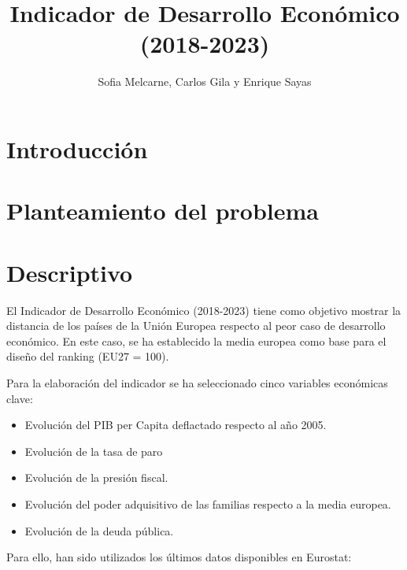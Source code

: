 \documentclass[
  letterpaper,
  DIV=11,
  numbers=noendperiod]{scrartcl}
\title{Indicador de Desarrollo Económico (2018-2023)}
\author{Sofia Melcarne, Carlos Gila y Enrique Sayas}
\date{}
\providecommand{\tightlist}{%
  \setlength{\itemsep}{0pt}\setlength{\parskip}{0pt}}\usepackage{longtable,booktabs,array}
\renewcommand*\contentsname{Table of contents}
\newcommand\contentsname{Table of contents}
\begin{document}
\maketitle
\ifdefined\Shaded\renewenvironment{Shaded}{\begin{tcolorbox}[borderline west={3pt}{0pt}{shadecolor}, sharp corners, enhanced, interior hidden, frame hidden, boxrule=0pt, breakable]}{\end{tcolorbox}}\fi

\renewcommand*\contentsname{Table of contents}
{
\hypersetup{linkcolor=}
\setcounter{tocdepth}{3}
\tableofcontents
}
\hypertarget{introducciuxf3n}{%
\section{Introducción}\label{introducciuxf3n}}

\hypertarget{planteamiento-del-problema}{%
\section{Planteamiento del problema}\label{planteamiento-del-problema}}

\hypertarget{descriptivo}{%
\section{Descriptivo}\label{descriptivo}}

El Indicador de Desarrollo Económico (2018-2023) tiene como objetivo
mostrar la distancia de los países de la Unión Europea respecto al peor
caso de desarrollo económico. En este caso, se ha establecido la media
europea como base para el diseño del ranking (EU27 = 100).

Para la elaboración del indicador se ha seleccionado cinco variables
económicas clave:

\begin{itemize}
\tightlist
\item
  Evolución del PIB per Capita deflactado respecto al año 2005.
\item
  Evolución de la tasa de paro
\item
  Evolución de la presión fiscal.
\item
  Evolución del poder adquisitivo de las familias respecto a la media
  europea.
\item
  Evolución de la deuda pública.
\end{itemize}

Para ello, han sido utilizados los últimos datos disponibles en
Eurostat:
\end{document}
